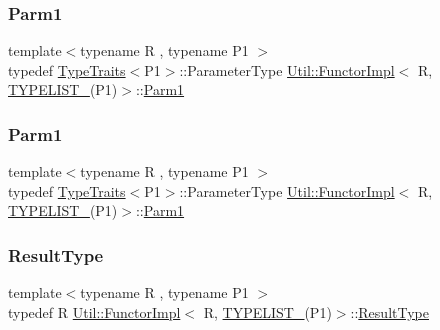 \subsubsection{\texorpdfstring{Parm1}{Parm1}\hspace{0.1cm}{\footnotesize\ttfamily [1/2]}}
{\footnotesize\ttfamily template$<$typename R , typename P1 $>$ \\
typedef \mbox{\hyperlink{classUtil_1_1TypeTraits}{Type\+Traits}}$<$P1$>$\+::Parameter\+Type \mbox{\hyperlink{classUtil_1_1FunctorImpl}{Util\+::\+Functor\+Impl}}$<$ R, \mbox{\hyperlink{install_2include_2adat_2typelist_8h_a6a7a6aa3dece450c8d239713e2952df7}{T\+Y\+P\+E\+L\+I\+S\+T\+\_}}(P1)$>$\+::\mbox{\hyperlink{structUtil_1_1Private_1_1FunctorImplBase_a9d61e693d6c616dea5bd9d9073c7d21a}{Parm1}}}

\mbox{\label{classUtil_1_1FunctorImpl_3_01R_00_01TYPELIST__1_07P1_08_4_a907de03623e2a575252ce08c64b52a8d}} 
\subsubsection{\texorpdfstring{Parm1}{Parm1}\hspace{0.1cm}{\footnotesize\ttfamily [2/2]}}
{\footnotesize\ttfamily template$<$typename R , typename P1 $>$ \\
typedef \mbox{\hyperlink{classUtil_1_1TypeTraits}{Type\+Traits}}$<$P1$>$\+::Parameter\+Type \mbox{\hyperlink{classUtil_1_1FunctorImpl}{Util\+::\+Functor\+Impl}}$<$ R, \mbox{\hyperlink{install_2include_2adat_2typelist_8h_a6a7a6aa3dece450c8d239713e2952df7}{T\+Y\+P\+E\+L\+I\+S\+T\+\_}}(P1)$>$\+::\mbox{\hyperlink{structUtil_1_1Private_1_1FunctorImplBase_a9d61e693d6c616dea5bd9d9073c7d21a}{Parm1}}}

\mbox{\label{classUtil_1_1FunctorImpl_3_01R_00_01TYPELIST__1_07P1_08_4_a15eeae50d81fe84dfae39ecc200cb08a}} 
\subsubsection{\texorpdfstring{ResultType}{ResultType}\hspace{0.1cm}{\footnotesize\ttfamily [1/2]}}
{\footnotesize\ttfamily template$<$typename R , typename P1 $>$ \\
typedef R \mbox{\hyperlink{classUtil_1_1FunctorImpl}{Util\+::\+Functor\+Impl}}$<$ R, \mbox{\hyperlink{install_2include_2adat_2typelist_8h_a6a7a6aa3dece450c8d239713e2952df7}{T\+Y\+P\+E\+L\+I\+S\+T\+\_}}(P1)$>$\+::\mbox{\hyperlink{structUtil_1_1Private_1_1FunctorImplBase_a5e95fd30fdd89f3c5080b68ab5891bc3}{Result\+Type}}}

